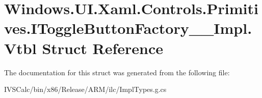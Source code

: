 \hypertarget{struct_windows_1_1_u_i_1_1_xaml_1_1_controls_1_1_primitives_1_1_i_toggle_button_factory_____impl_1_1_vtbl}{}\section{Windows.\+U\+I.\+Xaml.\+Controls.\+Primitives.\+I\+Toggle\+Button\+Factory\+\_\+\+\_\+\+Impl.\+Vtbl Struct Reference}
\label{struct_windows_1_1_u_i_1_1_xaml_1_1_controls_1_1_primitives_1_1_i_toggle_button_factory_____impl_1_1_vtbl}


The documentation for this struct was generated from the following file\+:\begin{DoxyCompactItemize}
\item 
I\+V\+S\+Calc/bin/x86/\+Release/\+A\+R\+M/ilc/Impl\+Types.\+g.\+cs\end{DoxyCompactItemize}
